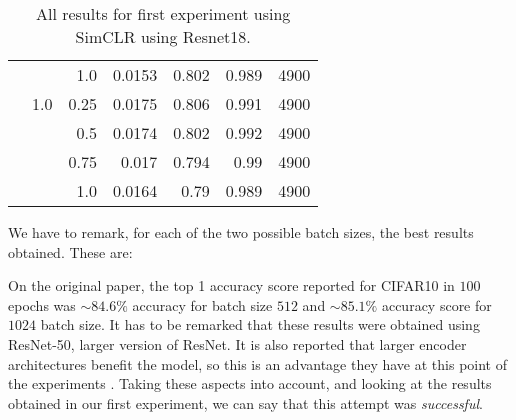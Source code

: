\begin{table}[H]
{\begin{tabular}{rrrrrrr}
                  &               & 1.0           & 0.0153               & 0.802                   & 0.989                   & 4900          \\
                  & 1.0           & 0.25          & 0.0175               & 0.806                   & 0.991                   & 4900          \\
                  &               & 0.5           & 0.0174               & 0.802                   & 0.992                   & 4900          \\
                  &               & 0.75          & 0.017                & 0.794                   & 0.99                    & 4900          \\
                  &               & 1.0           & 0.0164               & 0.79                    & 0.989                   & 4900         
    \end{tabular}
    }
    
    \caption{All results for first experiment using SimCLR using Resnet18.}
    
    \label{table:simclr:gridsearch:1}
    \end{table}

We have to remark, for each of the two possible batch sizes, the best results obtained. These are:

\begin{table}[H]
    \label{table:best:first:simclr}
\centering
{}
\caption{Best results for the grid search experiment with SimCLR.}
\end{table}

\begin{remark}
On the original paper, the top 1 accuracy score reported for CIFAR10 in $100$ epochs was $\sim 84.6\%$ accuracy for batch size $512$ and $\sim 85.1 \%$ accuracy score for $1024$ batch size. It has to be remarked that these results were obtained using ResNet-50,  larger version of ResNet. It is also reported that larger encoder architectures benefit the model, so this is an advantage they have at this point of the experiments . Taking these aspects into account, and looking at the results obtained in our first experiment, we can say that this attempt was \emph{successful}.
\end{remark}

